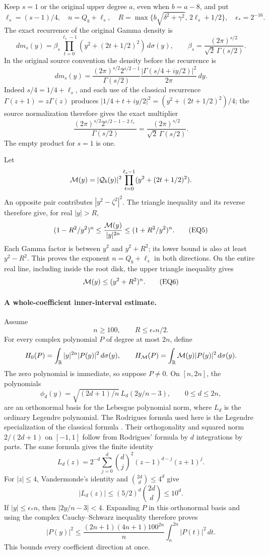 Keep \(s=1\) or the original upper degree \(a\), even when \(b=a-8\), and
put
\[
 \ell_s=(s-1)/4,\quad n=Q_b+\ell_s,\quad
 R=\max\{b\sqrt{\delta^2+\gamma^2},\,2\ell_s+1/2\},\quad
 \epsilon_*=2^{-16}.
\]
The exact recurrence of the original Gamma density is
\[
 dm_s(y)=\beta_s\prod_{t=0}^{\ell_s-1}
      (y^2+(2t+1/2)^2)\,d\sigma(y),\qquad
 \beta_s=\frac{(2\pi)^{s/2}}{\sqrt2\,\Gamma(s/2)}.
\tag{EQ4}
\]
In the original source convention the density before the recurrence is
\[
 dm_s(y)=\frac{(2\pi)^{s/2}2^{s/2-1}}{\Gamma(s/2)}
       \frac{|\Gamma(s/4+iy/2)|^2}{2\pi}\,dy .
\]
Indeed \(s/4=1/4+\ell_s\), and each use of the classical recurrence
\(\Gamma(z+1)=z\Gamma(z)\)
\cite[eq.~(5.5.1)]{human:dlmf5} produces
\(|1/4+t+iy/2|^2=(y^2+(2t+1/2)^2)/4\); the source normalization
therefore gives the exact multiplier
\[
 \frac{(2\pi)^{s/2}2^{s/2-1-2\ell_s}}{\Gamma(s/2)}
 =\frac{(2\pi)^{s/2}}{\sqrt2\,\Gamma(s/2)}.
\]
The empty product for \(s=1\) is one.

Let
\[
 {\cal M}(y)=|{\cal Q}_b(y)|^2
       \prod_{t=0}^{\ell_s-1}(y^2+(2t+1/2)^2).
\]
An opposite pair contributes \(|y^2-\zeta^2|^2\).  The triangle
inequality and its reverse therefore give, for real \(|y|>R\),
\[
 (1-R^2/y^2)^n
 \le \frac{{\cal M}(y)}{|y|^{2n}}
 \le (1+R^2/y^2)^n.
\tag{EQ5}
\]
Each Gamma factor is between \(y^2\) and \(y^2+R^2\); its lower bound
is also at least \(y^2-R^2\).  This proves the exponent \(n=Q_b+\ell_s\)
in both directions.  On the entire real line, including inside the root
disk, the upper triangle inequality gives
\[
 {\cal M}(y)\le(y^2+R^2)^n.
\tag{EQ6}
\]

\paragraph{A whole-coefficient inner-interval estimate.}
Assume
\[
 n\ge100,\qquad R\le\epsilon_*n/2.
\tag{EQ7}
\]
For every complex polynomial \(P\) of degree at most \(2n\), define
\[
 H_0(P)=\int_{\mathbb R}|y|^{2n}|P(y)|^2\,d\sigma(y),\qquad
 H_{\cal M}(P)=\int_{\mathbb R}{\cal M}(y)|P(y)|^2\,d\sigma(y).
\]
The zero polynomial is immediate, so suppose \(P\ne0\).
On \([n,2n]\), the polynomials
\[
 \phi_d(y)=\sqrt{(2d+1)/n}\,L_d(2y/n-3),\qquad 0\le d\le2n,
\]
are an orthonormal basis for the Lebesgue polynomial norm, where \(L_d\)
is the ordinary Legendre polynomial.  The Rodrigues formula used here is
the Legendre specialization of the classical formula
\cite[eq.~(18.5.5) and Table~18.5.1]{human:dlmf18}.
Their orthogonality and squared
norm \(2/(2d+1)\) on \([-1,1]\) follow from Rodrigues' formula by \(d\)
integrations by parts.  The same formula gives the finite identity
\[
 L_d(z)=2^{-d}\sum_{j=0}^d
       \binom dj^2(z-1)^{d-j}(z+1)^j.
\]
For \(|z|\le4\), Vandermonde's identity and
\(\binom{2d}{d}\le4^d\) give
\[
 |L_d(z)|\le (5/2)^d\binom{2d}{d}\le10^d.
\]
If \(|y|\le\epsilon_*n\), then \(|2y/n-3|<4\).  Expanding \(P\) in
this orthonormal basis and using the complex Cauchy--Schwarz inequality
therefore proves
\[
 |P(y)|^2\le
 \frac{(2n+1)(4n+1)100^{2n}}{n}
       \int_n^{2n}|P(t)|^2\,dt .
\tag{EQ8}
\]
This bounds every coefficient direction at once.

